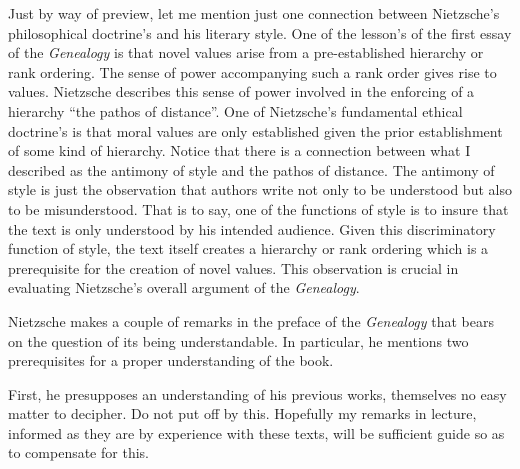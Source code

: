 Just by way of preview, let me mention just one connection between Nietzsche's philosophical doctrine's and his literary style. One of the lesson's of the first essay of the \emph{Genealogy} is that novel values arise from a pre-established hierarchy or rank ordering. The sense of power accompanying such a rank order gives rise to values. Nietzsche describes this sense of power involved in the enforcing of a hierarchy ``the pathos of distance''. One of Nietzsche's fundamental ethical doctrine's is that moral values are only established given the prior establishment of some kind of hierarchy. Notice that there is a connection between what I described as the antimony of style and the pathos of distance. The antimony of style is just the observation that authors write not only to be understood but also to be misunderstood. That is to say, one of the functions of style is to insure that the text is only understood by his intended audience. Given this discriminatory function of style, the text itself creates a hierarchy or rank ordering which is a prerequisite for the creation of novel values. This observation is crucial in evaluating Nietzsche's overall argument of the \emph{Genealogy}.

Nietzsche makes a couple of remarks in the preface of the \emph{Genealogy} that bears on the question of its being understandable. In particular, he mentions two prerequisites for a proper understanding of the book. 

First, he presupposes an understanding of his previous works, themselves no easy matter to decipher. Do not put off by this. Hopefully my remarks in lecture, informed as they are by experience with these texts, will be sufficient guide so as to compensate for this.

